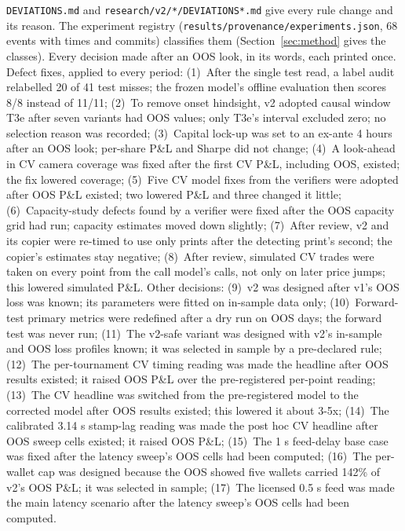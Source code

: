 \documentclass[11pt,letterpaper]{article}
\begin{document}
 \nolinkurl{DEVIATIONS.md} and \nolinkurl{research/v2/*/DEVIATIONS*.md} give every
rule change and its reason.
The experiment registry (\nolinkurl{results/provenance/experiments.json}, 68 events with times and
commits) classifies them (Section~\ref{sec:method} gives the classes). Every decision made after an OOS look, in its
words, each printed once.
Defect fixes, applied to every period:
(1)~After the single test read, a label audit relabelled 20 of 41 test misses; the frozen model's offline evaluation then scores 8/8 instead of 11/11; (2)~To remove onset hindsight, v2 adopted causal window T3e after seven variants had OOS values; only T3e's interval excluded zero; no selection reason was recorded; (3)~Capital lock-up was set to an ex-ante 4 hours after an OOS look; per-share P\&L and Sharpe did not change; (4)~A look-ahead in CV camera coverage was fixed after the first CV P\&L, including OOS, existed; the fix lowered coverage; (5)~Five CV model fixes from the verifiers were adopted after OOS P\&L existed; two lowered P\&L and three changed it little; (6)~Capacity-study defects found by a verifier were fixed after the OOS capacity grid had run; capacity estimates moved down slightly; (7)~After review, v2 and its copier were re-timed to use only prints after the detecting print's second; the copier's estimates stay negative; (8)~After review, simulated CV trades were taken on every point from the call model's calls, not only on later price jumps; this lowered simulated P\&L.
Other decisions:
(9)~v2 was designed after v1's OOS loss was known; its parameters were fitted on in-sample data only; (10)~Forward-test primary metrics were redefined after a dry run on OOS days; the forward test was never run; (11)~The v2-safe variant was designed with v2's in-sample and OOS loss profiles known; it was selected in sample by a pre-declared rule; (12)~The per-tournament CV timing reading was made the headline after OOS results existed; it raised OOS P\&L over the pre-registered per-point reading; (13)~The CV headline was switched from the pre-registered model to the corrected model after OOS results existed; this lowered it about 3-5x; (14)~The calibrated 3.14 s stamp-lag reading was made the post hoc CV headline after OOS sweep cells existed; it raised OOS P\&L; (15)~The 1 s feed-delay base case was fixed after the latency sweep's OOS cells had been computed; (16)~The per-wallet cap was designed because the OOS showed five wallets carried 142\% of v2's OOS P\&L; it was selected in sample; (17)~The licensed 0.5 s feed was made the main latency scenario after the latency sweep's OOS cells had been computed.
\end{document}
